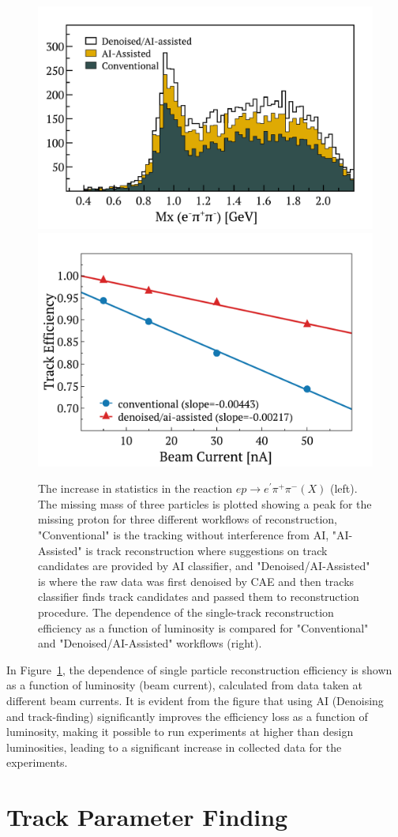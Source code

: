 \documentclass[preprint,12pt]{elsarticle}
\begin{document}
\begin{figure}[h!]
\centering
\includegraphics[width=0.44\columnwidth]{images/figure_denoise_mxp.pdf}
\includegraphics[width=0.42\columnwidth]{images/luminosity_scan.pdf}
\caption{The increase in statistics in the reaction $ep\rightarrow e^\prime\pi^+\pi^-(X)$ (left). The missing mass of three particles is plotted showing a peak for the missing proton for
three different workflows of reconstruction, "Conventional" is the tracking without interference from AI, "AI-Assisted" is track reconstruction where suggestions on track candidates are provided by AI classifier, and "Denoised/AI-Assisted" is where the raw data was first denoised by CAE and then tracks classifier finds track candidates and passed them to reconstruction procedure.  The dependence of the single-track reconstruction efficiency as a function of luminosity is compared for "Conventional" and "Denoised/AI-Assisted" workflows (right). } 
\label{fig:ai_vs_conv}
\end{figure}

In Figure~\ref{fig:ai_vs_conv}, the dependence of single particle reconstruction efficiency is shown as a function of luminosity (beam current), calculated from data taken at different beam currents. It is evident from the figure that using AI (Denoising and track-finding) significantly improves the efficiency loss as a function of luminosity, making it possible to run experiments at higher than design luminosities, leading to a significant increase in collected data for the experiments.

\section{Track Parameter Finding}
\end{document}
